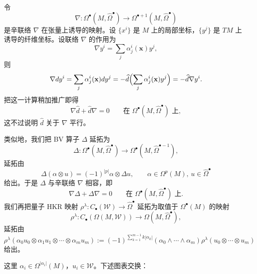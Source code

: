 令
\[
\nabla:\Omega^\bullet(M,\widehat\Omega^\bullet)
\longrightarrow\Omega^{\bullet+1}(M,\widehat\Omega^\bullet)
\]
是辛联络 $\nabla$ 在张量上诱导的映射。设 $\{x^i\}$ 是 $M$ 上的局部坐标，$\{y^j\}$ 是 $TM$ 上诱导的纤维坐标。设联络 $\nabla$ 的作用为
\[
\nabla y^i=\sum_j\alpha^i_j(\mathbf x)y^j,
\]
则
\[
\nabla dy^i=\sum_j\alpha^i_j(\mathbf x)dy^j
=-\widehat d\Bigl(\sum_j\alpha^i_j(\mathbf x)y^j\Bigr)
=-\widehat d\nabla y^i.
\]
把这一计算稍加推广即得
\[
\nabla\widehat d+\widehat d\nabla=0
\qquad\text{在 }\Omega^\bullet(M,\widehat\Omega^\bullet)\text{ 上},
\]
这不过说明 $\widehat d$ 关于 $\nabla$ 平行。

类似地，我们把 BV 算子 $\Delta$ 延拓为
\[
\Delta:\Omega^\bullet(M,\widehat\Omega^\bullet)
\longrightarrow\Omega^\bullet(M,\widehat\Omega^{\bullet-1}),
\]
延拓由
\[
\Delta(\alpha\otimes u)=(-1)^{|p|}\alpha\otimes\Delta u,
\qquad \alpha\in\Omega^p(M),\ u\in\widehat\Omega^\bullet
\]
给出。于是 $\Delta$ 与辛联络 $\nabla$ 相容，即
\[
\nabla\Delta+\Delta\nabla=0
\qquad\text{在 }\Omega^\bullet(M,\widehat\Omega^\bullet)\text{ 上}.
\]
我们再把量子 HKR 映射 $\rho^\lambda:C_\bullet(\mathcal W)\to\widehat\Omega^\bullet$ 延拓为取值于 $\Omega^\bullet(M)$ 的映射
\[
\rho^\lambda:C_\bullet(\Omega(M,\mathcal W))
\longrightarrow\Omega(M,\widehat\Omega^\bullet),
\]
延拓由
\[
\rho^\lambda(\alpha_0u_0\otimes\alpha_1u_1\otimes\cdots\otimes\alpha_mu_m)
:=(-1)^{\sum_{k=1}^{m-1}k|\alpha_k|}
(\alpha_0\wedge\cdots\wedge\alpha_m)\rho^\lambda(u_0\otimes\cdots\otimes u_m)
\]
给出。

这里 $\alpha_i\in\Omega^{|\alpha_i|}(M)$，$u_i\in\mathcal W$。下述图表交换：
\begin{center}
\end{center}

